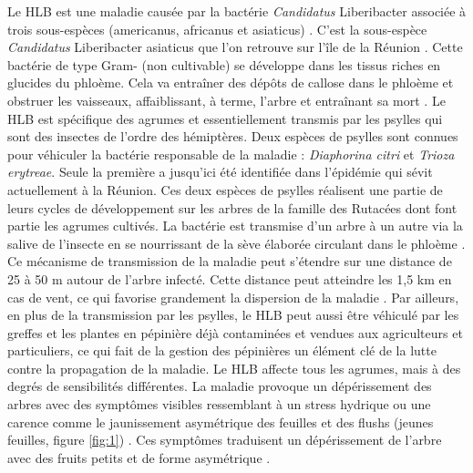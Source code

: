 \documentclass[
  11pt,
  french,
  a4paper,
  extrafontsizes,onecolumn,openright
  ]{memoir}
\begin{document}
Le HLB est une maladie causée par la bactérie \emph{Candidatus} Liberibacter associée à trois sous-espèces (americanus, africanus et asiaticus) \autocite{wang_citrus_2019}. C'est la sous-espèce \emph{Candidatus} Liberibacter asiaticus que l'on retrouve sur l'île de la Réunion \autocite{aubert_greening_1989}. Cette bactérie de type Gram- (non cultivable) se développe dans les tissus riches en glucides du phloème. Cela va entraîner des dépôts de callose dans le phloème et obstruer les vaisseaux, affaiblissant, à terme, l'arbre et entraînant sa mort \autocite{bove_huanglongbing_2006}. Le HLB est spécifique des agrumes et essentiellement transmis par les psylles qui sont des insectes de l'ordre des hémiptères. Deux espèces de psylles sont connues pour véhiculer la bactérie responsable de la maladie : \emph{Diaphorina citri} et \emph{Trioza erytreae}. Seule la première a jusqu'ici été identifiée dans l'épidémie qui sévit actuellement à la Réunion. Ces deux espèces de psylles réalisent une partie de leurs cycles de développement sur les arbres de la famille des Rutacées dont font partie les agrumes cultivés. La bactérie est transmise d'un arbre à un autre via la salive de l'insecte en se nourrissant de la sève élaborée circulant dans le phloème \autocite{narouei-khandan_global_2016}. Ce mécanisme de transmission de la maladie peut s'étendre sur une distance de 25 à 50 m autour de l'arbre infecté. Cette distance peut atteindre les 1,5 km en cas de vent, ce qui favorise grandement la dispersion de la maladie \autocite{bove_huanglongbing_2006}. Par ailleurs, en plus de la transmission par les psylles, le HLB peut aussi être véhiculé par les greffes et les plantes en pépinière déjà contaminées et vendues aux agriculteurs et particuliers, ce qui fait de la gestion des pépinières un élément clé de la lutte contre la propagation de la maladie.
Le HLB affecte tous les agrumes, mais à des degrés de sensibilités différentes. La maladie provoque un dépérissement des arbres avec des symptômes visibles ressemblant à un stress hydrique ou une carence comme le jaunissement asymétrique des feuilles et des flushs (jeunes feuilles, figure \ref{fig:1}\autocite{guilloteau_utilisation_2018}) \autocite{bove_huanglongbing_2006}. Ces symptômes traduisent un dépérissement de l'arbre avec des fruits petits et de forme asymétrique \autocite{gottwald_preliminary_1989}.

\scriptsize
\end{document}
